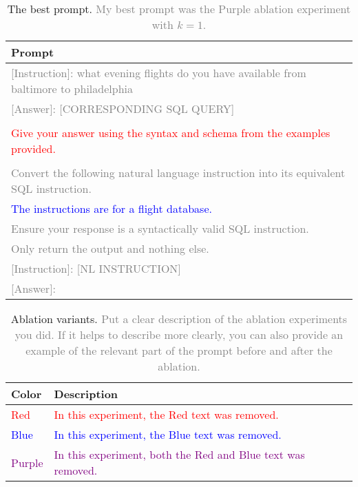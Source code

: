 \documentclass{article}
\begin{document}
\begin{table}[h!]
\centering
\begin{tabular}{p{13.5cm}}
\toprule
\textbf{Prompt} \\
\midrule
\textcolor{gray}{[Instruction]: what evening flights do you have available from baltimore to philadelphia}\\
 \textcolor{gray}{[Answer]: [CORRESPONDING SQL QUERY]} \\
 \\
 \textcolor{Red}{Give your answer using the syntax and schema from the examples provided.} \\
 \\
 \textcolor{gray}{Convert the following natural language instruction into its equivalent SQL instruction.} \\
 \textcolor{Blue}{The instructions are for a flight database.} \\
 \textcolor{gray}{Ensure your response is a syntactically valid SQL instruction.} \\
 \textcolor{gray}{Only return the output and nothing else.} \\
 \textcolor{gray}{[Instruction]: [NL INSTRUCTION]} \\
 \textcolor{gray}{[Answer]: } \\

\bottomrule
\end{tabular}
\caption{The best prompt.
{\textcolor{gray}{My best prompt was the Purple ablation experiment with $k=1$.}}
}
\label{tab:best_prompt}
\end{table}



\begin{table}[h!]
\centering
\begin{tabular}{p{2cm}p{10cm}}
\toprule
\textbf{Color} & \textbf{Description} \\
\midrule
\textcolor{Red}{Red} & \textcolor{Red}{In this experiment, the Red text was removed.} \\
\textcolor{Blue}{Blue} & \textcolor{Blue}{In this experiment, the Blue text was removed.} \\
\textcolor{Purple}{Purple} & \textcolor{Purple}{In this experiment, both the Red and Blue text was removed.} \\
\bottomrule
\end{tabular}
\caption{Ablation variants.
{\textcolor{gray}{Put a clear description of the ablation experiments you did. If it helps to describe more clearly, you can also provide an example of the relevant part of the prompt before and after the ablation.}
}}
\label{tab:ablation_explanation}
\end{table}
\end{document}

